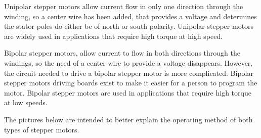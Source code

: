 Unipolar stepper motors allow current flow in only one direction through the winding, so a center wire has been added, that provides a voltage and determines the stator poles do either be of north or south polarity. Unipolar stepper motors are widely used in applications that require high torque at high speed.

Bipolar stepper motors, allow current to flow in both directions through the windings, so the need of a center wire to provide a voltage disappears. However, the circuit needed to drive a bipolar stepper motor is more complicated. Bipolar stepper motors driving boards exist to make it easier for a person to program the motor. Bipolar stepper motors are used in applications that require high torque at low speeds.

The pictures below are intended to better explain the operating method of both types of stepper motors. 

\begin{figure}[htp] 
    \centering
    \hfill
    \hfill
\end{figure}

